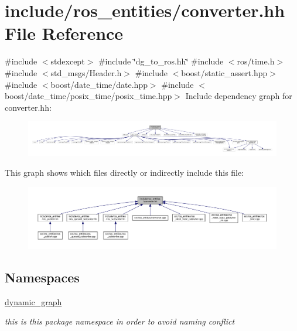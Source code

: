 \hypertarget{converter_8hh}{}\section{include/ros\+\_\+entities/converter.hh File Reference}
\label{converter_8hh}
{\ttfamily \#include $<$stdexcept$>$}\newline
{\ttfamily \#include \char`\"{}dg\+\_\+to\+\_\+ros.\+hh\char`\"{}}\newline
{\ttfamily \#include $<$ros/time.\+h$>$}\newline
{\ttfamily \#include $<$std\+\_\+msgs/\+Header.\+h$>$}\newline
{\ttfamily \#include $<$boost/static\+\_\+assert.\+hpp$>$}\newline
{\ttfamily \#include $<$boost/date\+\_\+time/date.\+hpp$>$}\newline
{\ttfamily \#include $<$boost/date\+\_\+time/posix\+\_\+time/posix\+\_\+time.\+hpp$>$}\newline
Include dependency graph for converter.\+hh\+:
\nopagebreak
\begin{figure}[H]
\begin{center}
\leavevmode
\includegraphics[width=350pt]{converter_8hh__incl}
\end{center}
\end{figure}
This graph shows which files directly or indirectly include this file\+:
\nopagebreak
\begin{figure}[H]
\begin{center}
\leavevmode
\includegraphics[width=350pt]{converter_8hh__dep__incl}
\end{center}
\end{figure}
\subsection*{Namespaces}
\begin{DoxyCompactItemize}
\item 
 \hyperlink{namespacedynamic__graph}{dynamic\+\_\+graph}
\begin{DoxyCompactList}\small\item\em this is this package namespace in order to avoid naming conflict \end{DoxyCompactList}\end{DoxyCompactItemize}

